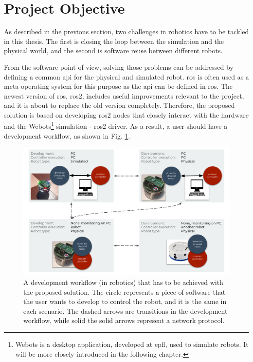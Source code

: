 \section{Project Objective}

As described in the previous section, two challenges in robotics have to be tackled in this thesis.
The first is closing the loop between the simulation and the physical world, and the second is software reuse between different robots.


From the software point of view, solving those problems can be addressed by defining a common \ac{api} for the physical and simulated robot.
\ac{ros} is often used as a meta-operating system for this purpose as the \ac{api} can be defined in \ac{ros}.
The newest version of \ac{ros}, \ac{ros2}, includes useful improvements relevant to the project, and it is about to replace the old version completely.
Therefore, the proposed solution is based on developing \ac{ros2} nodes that closely interact with the hardware and the Webots\footnote{Webots is a desktop application, developed at \ac{epfl}, used to simulate robots.
It will be more closely introduced in the following chapter.} simulation - \ac{ros2} driver.
As a result, a user should have a development workflow, as shown in Fig. \ref{fig:introduction:desired_workflow}.  

\begin{figure}[H]
    \centering
    \includegraphics[width=\textwidth]{introduction/figures/desired_workflow.pdf}
    \caption[A development workflow (in robotics) that has to be achieved with the proposed solution]{
        A development workflow (in robotics) that has to be achieved with the proposed solution.
        The circle represents a piece of software that the user wants to develop to control the robot, and it is the same in each scenario.
        The dashed arrows are transitions in the development workflow, while solid the solid arrows represent a network protocol.
    }
    \label{fig:introduction:desired_workflow}
\end{figure}

